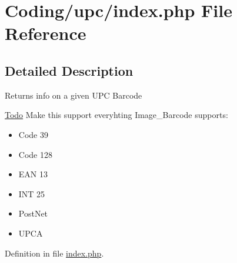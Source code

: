 \hypertarget{index_8php}{
\section{Coding/upc/index.php File Reference}
\label{index_8php}
}


\subsection{Detailed Description}
Returns info on a given UPC Barcode \begin{Desc}
\item[\hyperlink{todo__todo000001}{Todo}]Make this support everyhting Image\_\-Barcode supports:\begin{itemize}
\item Code 39\item Code 128\item EAN 13\item INT 25\item PostNet\item UPCA \end{itemize}
\end{Desc}


Definition in file \hyperlink{index_8php-source}{index.php}.